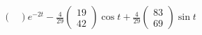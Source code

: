 \documentclass{article}
\begin{document}
\begin{align*}
\begin{pmatrix}
                                                                \end{pmatrix} e^{-2 t} - \frac{4}{29} \begin{pmatrix}
                                                                                                        19 \\
                                                                                                        42
                                                                                                      \end{pmatrix} \cos t + \frac{4}{29} \begin{pmatrix}
                                                                                                                                            83 \\
                                                                                                                                            69
                                                                                                                                          \end{pmatrix} \sin t
\end{align*}

\setcounter{subsubsection}{36}
\subsubsection{}
\end{document}
